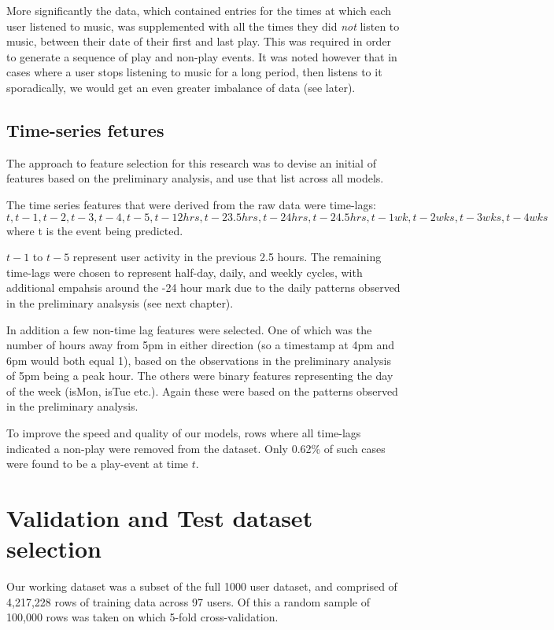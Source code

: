 More significantly the data, which contained entries for the times at which each user listened to music, was supplemented with all the times they did \emph{not} listen to music, between their date of their first and last play.  This was required in order to generate a sequence of play and non-play events. It was noted however that in cases where a user stops listening to music for a long period, then listens to it sporadically, we would get an even greater imbalance of data (see later).

\subsection{Time-series fetures}

The approach to feature selection for this research was to devise an initial of features based on the preliminary analysis, and use that list across all models.

The time series features that were derived from the raw data were time-lags: $t, t-1, t-2, t-3, t-4, t-5,  t-12hrs, t-23.5hrs, t-24hrs, t-24.5hrs, t-1wk, t-2wks, t-3wks, t-4wks$ where t is the event being predicted. 

$t-1$ to $t-5$ represent user activity in the previous 2.5 hours. The remaining time-lags were chosen to represent half-day, daily, and weekly cycles, with additional empahsis around the -24 hour mark due to the daily patterns observed in the preliminary analsysis (see next chapter).  

In addition a few non-time lag features were selected. One of which was the number of hours away from 5pm in either direction (so a timestamp at 4pm and 6pm would both equal 1), based on the observations in the preliminary analysis of 5pm being a peak hour.
The others were binary features representing the day of the week (isMon, isTue etc.). Again these were based on the patterns observed in the preliminary analysis.

To improve the speed and quality of our models, rows where all time-lags indicated a non-play were removed from the dataset. Only 0.62\% of such cases were found to be a play-event at time $t$.

\section{Validation and Test dataset selection}

Our working dataset was a subset of the full 1000 user dataset, and comprised of 4,217,228 rows of training data across 97 users. Of this a random sample of 100,000 rows was taken on which 5-fold cross-validation. 

